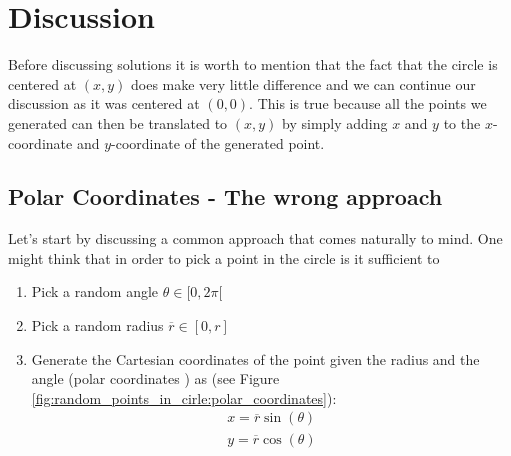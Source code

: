 \section{Discussion}
\label{random_points_in_circle:sec:discussion}
Before discussing solutions it is worth to mention that the fact that the circle is centered at $(x,y)$ does make very little difference and we can continue our discussion as it was centered at $(0,0)$. This is true because all the points we generated can then be translated to $(x,y)$ by simply adding $x$ and $y$ to the $x$-coordinate and $y$-coordinate of the generated point.

\subsection{Polar Coordinates - The wrong approach}
\label{random_points_in_circle:sec:buggy}
Let's start by discussing a common approach that comes naturally to mind. One might think that in order to pick a point in the circle is it sufficient to 
\begin{enumerate}
	\item Pick a random angle $\theta \in [0, 2\pi[ $
	\item Pick a random radius $\overline{r} \in [0,r]$
	\item Generate the Cartesian coordinates of the point given the radius and the angle (polar coordinates \cite{cit:wiki:polarcoordinates}) as (see Figure \ref{fig:random_points_in_cirle:polar_coordinates}):
	\begin{gather*}
		 x=\overline{r}\sin(\theta) \\
		 y=\overline{r}\cos(\theta) 
	\end{gather*}
\end{enumerate}

